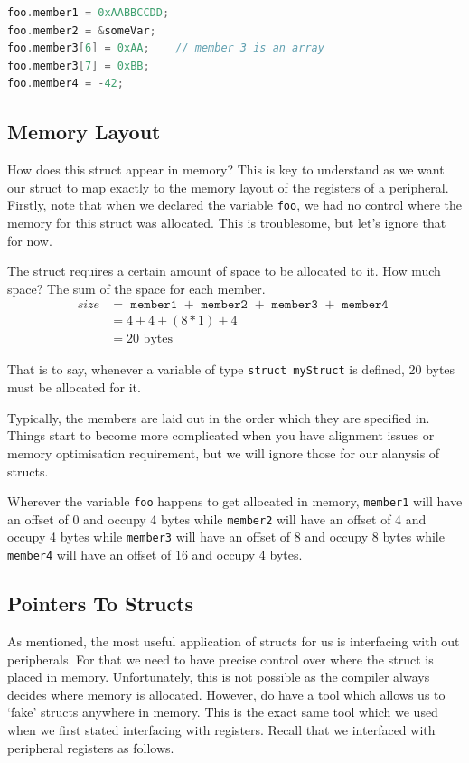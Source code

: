 \begin{lstlisting}[language=C]
foo.member1 = 0xAABBCCDD;
foo.member2 = &someVar;
foo.member3[6] = 0xAA;    // member 3 is an array
foo.member3[7] = 0xBB;
foo.member4 = -42;
\end{lstlisting}

\subsection{Memory Layout}
How does this struct appear in memory? This is key to understand as we want our struct to map exactly to the memory layout of the registers of a peripheral. 
Firstly, note that when we declared the variable \texttt{foo}, we had no control where the memory for this struct was allocated. This is troublesome, but let's ignore that for now.

The struct requires a certain amount of space to be allocated to it. How much space? The sum of the space for each member. 
\begin{align*}
size &= \texttt{ member1 } + \texttt{ member2 } + \texttt{ member3 } + \texttt{ member4 }\\
 &= 4 + 4 + (8*1) + 4\\
 &= 20 \text{ bytes}
\end{align*}

That is to say, whenever a variable of type \texttt{struct myStruct} is defined, 20 bytes must be allocated for it. 

Typically, the members are laid out in the order which they are specified in. Things start to become more complicated when you have alignment issues or memory optimisation requirement, but we will ignore those for our alanysis of structs. 

Wherever the variable \texttt{foo} happens to get allocated in memory, \texttt{member1} will have an offset of 0 and occupy 4 bytes while \texttt{member2} will have an offset of 4 and occupy 4 bytes while \texttt{member3} will have an offset of 8 and occupy 8 bytes while \texttt{member4} will have an offset of 16 and occupy 4 bytes. 

\subsection{Pointers To Structs}
As mentioned, the most useful application of structs for us is interfacing with out peripherals. For that we need to have precise control over where the struct is placed in memory. Unfortunately, this is not possible as the compiler always decides where memory is allocated. 
However, do have a tool which allows us to `fake' structs anywhere in memory. This is the exact same tool which we used when we first stated interfacing with registers.
Recall that we interfaced with peripheral registers as follows.

